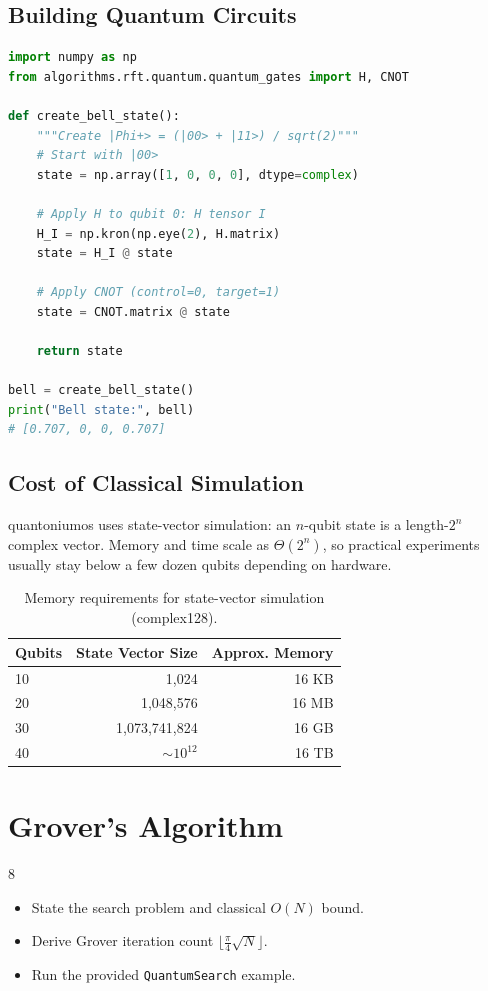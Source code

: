 \documentclass[11pt, a4paper, openany]{book}
\theoremstyle{definition}
\begin{document}
\section{Building Quantum Circuits}
\begin{lstlisting}[language=Python, caption={Creating a Bell State}]
import numpy as np
from algorithms.rft.quantum.quantum_gates import H, CNOT

def create_bell_state():
    """Create |Phi+> = (|00> + |11>) / sqrt(2)"""
    # Start with |00>
    state = np.array([1, 0, 0, 0], dtype=complex)
    
    # Apply H to qubit 0: H tensor I
    H_I = np.kron(np.eye(2), H.matrix)
    state = H_I @ state
    
    # Apply CNOT (control=0, target=1)
    state = CNOT.matrix @ state
    
    return state

bell = create_bell_state()
print("Bell state:", bell)
# [0.707, 0, 0, 0.707]
\end{lstlisting}

\section{Cost of Classical Simulation}
quantoniumos uses state-vector simulation: an $n$-qubit state is a length-$2^n$ complex vector. Memory and time scale as $\Theta(2^n)$, so practical experiments usually stay below a few dozen qubits depending on hardware.

\begin{table}[h]
\centering
\begin{tabular}{@{}lrr@{}}\toprule
Qubits & State Vector Size & Approx. Memory \\ \midrule
10 & 1,024 & 16 KB \\
20 & 1,048,576 & 16 MB \\
30 & 1,073,741,824 & 16 GB \\
40 & $\sim 10^{12}$ & 16 TB \\ \bottomrule
\end{tabular}
\caption{Memory requirements for state-vector simulation (complex128).}
\end{table}

\chapter{Grover's Algorithm}

\begin{todobox}{8}
\begin{itemize}
    \item[$\square$] State the search problem and classical $O(N)$ bound.
    \item[$\square$] Derive Grover iteration count $\lfloor \frac{\pi}{4}\sqrt{N} \rfloor$.
    \item[$\square$] Run the provided \texttt{QuantumSearch} example.
\end{itemize}
\end{todobox}
\end{document}
